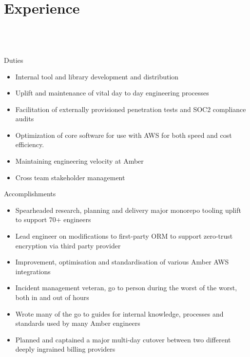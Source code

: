 \documentclass{resume}
\begin{document}
\section{{\faBriefcase} Experience}
 \\
 \\
 \\
Duties \\
\begin{itemize}
  \item Internal tool and library development and distribution
  \item Uplift and maintenance of vital day to day engineering processes  
  \item Facilitation of externally provisioned penetration tests and SOC2 compliance audits
  \item Optimization of core software for use with AWS for both speed and cost efficiency.
  \item Maintaining engineering velocity at Amber
  \item Cross team stakeholder management
\end{itemize}
Accomplishments \\
\begin{itemize}
  \item Spearheaded research, planning and delivery major monorepo tooling uplift to support 70+ engineers
  \item Lead engineer on modifications to first-party ORM to support zero-trust encryption via third party provider
  \item Improvement, optimisation and standardisation of various Amber AWS integrations
  \item Incident management veteran, go to person during the worst of the worst, both in and out of hours
  \item Wrote many of the go to guides for internal knowledge, processes and standards used by many Amber engineers
  \item Planned and captained a major multi-day cutover between two different deeply ingrained billing providers 
\end{itemize}
\end{document}
